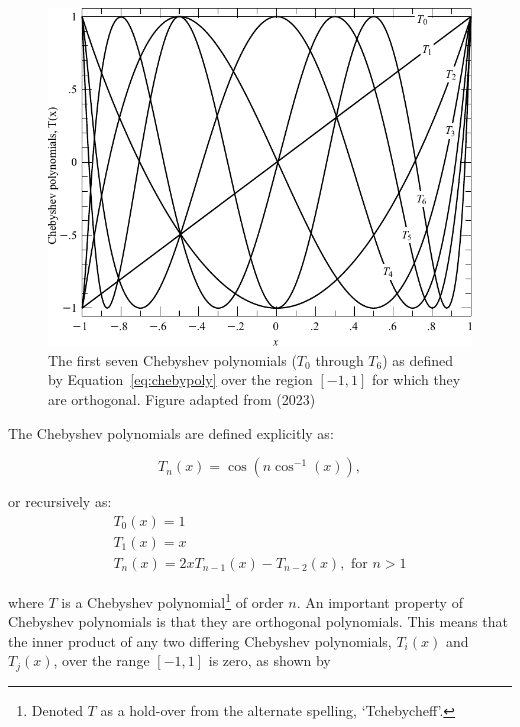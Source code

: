 \begin{figure}[t]
  \centering
  \includegraphics[width = 12cm]{figures/2_chebyshev.pdf}
  \caption{The first seven Chebyshev polynomials ($T_0$ through $T_{6}$) as defined by Equation~\ref{eq:chebypoly} over the region $[-1, 1]$ for which they are orthogonal. Figure adapted from \citep{numerical_recipes} (2023)\protect\footnotemark}
  \label{fig:chebyshev}
\end{figure}

The Chebyshev polynomials are defined explicitly as:

\begin{equation}
  T_{n}(x) = \cos(n \cos^{-1}(x)),
  \label{eq:chebypolyexplicit}
\end{equation}

\noindent or recursively as:
\begin{equation}
  \begin{gathered}
    T_{0}(x) = 1 \\
    T_{1}(x) = x  \\
    T_{n}(x) = 2 x T_{n - 1}(x) - T_{n - 2}(x), \text{ for } n > 1
  \end{gathered}
  \label{eq:chebypoly}
\end{equation}

\noindent where $T$ is a Chebyshev polynomial\footnote{Denoted $T$ as a hold-over from the alternate spelling, `Tchebycheff'.} of order $n$. An important property of Chebyshev polynomials is that they are orthogonal polynomials. This means that the inner product of any two differing Chebyshev polynomials, $T_{i}(x)$ and $T_{j}(x)$, over the range $[-1, 1]$ is zero, as shown by

